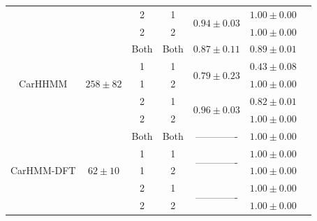 \begin{table}[ht]
{\begin{tabular}{ccccccc}
                            &                                    & 2                             & 1                                & \multirow{2}{*}{$0.94\pm0.03$}    & $1.00 \pm 0.00$                       \\ 
                            &                                    & 2                             & 2                                &                                   & $1.00 \pm 0.00$                       \\ \hline
\multirow{5}{*}{CarHHMM}    & \multirow{5}{*}{$258 \pm 82$}      & Both                          & Both                             & $0.87 \pm 0.11$                   & $0.89 \pm 0.01$                       \\
                            &                                    & 1                             & 1                                & \multirow{2}{*}{$0.79\pm0.23$}    & $0.43 \pm 0.08$                       \\ 
                            &                                    & 1                             & 2                                &                                   & $1.00 \pm 0.00$                       \\ 
                            &                                    & 2                             & 1                                & \multirow{2}{*}{$0.96\pm0.03$}    & $0.82 \pm 0.01$                       \\ 
                            &                                    & 2                             & 2                                &                                   & $1.00 \pm 0.00$                       \\ \hline
\multirow{5}{*}{CarHMM-DFT} & \multirow{5}{*}{$62 \pm 10$}       & Both                          & Both                             & -------------                     & $1.00 \pm 0.00$                       \\
                            &                                    & 1                             & 1                                & \multirow{2}{*}{-------------}    & $1.00 \pm 0.00$                       \\ 
                            &                                    & 1                             & 2                                &                                   & $1.00 \pm 0.00$                       \\ 
                            &                                    & 2                             & 1                                & \multirow{2}{*}{-------------}    & $1.00 \pm 0.00$                       \\ 
                            &                                    & 2                             & 2                                &                                   & $1.00 \pm 0.00$                       \\ \hline 
\end{tabular}
}
\label{table:accuracy}
\end{table}

